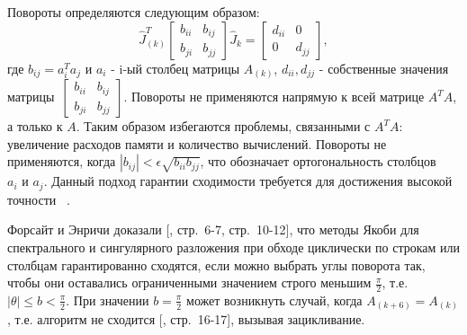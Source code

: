  Повороты определяются следующим образом: 
 \begin{equation} \label{one-sided Jacobi}
 \hat{J}^T_{(k)}\begin{bmatrix}
     b_{ii}&b_{ij}\\
     b_{ji}&b_{jj}
 \end{bmatrix}
 \hat{J}_{k} = \begin{bmatrix}
     d_{ii}&0\\
     0&d_{jj}
 \end{bmatrix},
 \end{equation}
 где $b_{ij} = a^T_ia_j$ и $a_i$ - i-ый столбец матрицы $A_{(k)}$, $d_{ii}, d_{jj}$ - собственные значения матрицы~$\begin{bmatrix}
      b_{ii}&b_{ij}\\
     b_{ji}&b_{jj}
 \end{bmatrix}$. 
Повороты не применяются напрямую к всей матрице $A^TA$, а только к $A$. Таким образом избегаются проблемы, связанными с $A^TA$: увеличение расходов памяти и количество вычислений. Повороты не применяются, когда $|b_{ij}| < \epsilon\sqrt{b_{ii}b_{jj}}$, что обозначает ортогональность столбцов $a_i\text{ и } a_j$.
Данный подход гарантии сходимости требуется для достижения высокой точности ~\cite{Dongarra2018}.

Форсайт и Энричи доказали [, стр.~6-7, стр.~10-12], что методы Якоби для спектрального и сингулярного разложения при обходе циклически по строкам или столбцам гарантированно сходятся, если можно выбрать углы поворота так, чтобы они оставались ограниченными значением строго меньшим $\frac{\pi}{2}$, т.е. $\left|\theta\right| \le b <\frac{\pi}{2}$. При значении $b = \frac{\pi}{2}$ может возникнуть случай, когда $A_{(k+6)}=A_{(k)}$, т.е. алгоритм не сходится [, стр.~16-17], вызывая зацикливание. 

